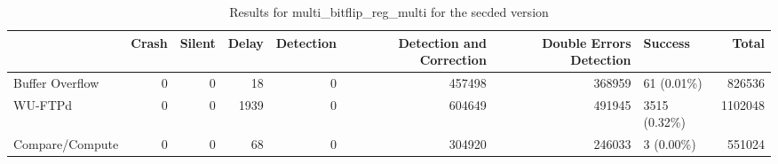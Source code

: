\begin{table}[t]
	\centering
	\caption{Results for multi_bitflip_reg_multi for the secded version}
	\label{table:end_sim_by_status_secded_4_multi_bitflip_reg_multi}
	\begin{tabular}{lrrrrrrlr}
		\toprule
		                & Crash & Silent & Delay & Detection & Detection and Correction & Double Errors Detection & Success       & Total   \\
		\midrule
		Buffer Overflow & 0     & 0      & 18    & 0         & 457498                   & 368959                  & 61 (0.01\%)   & 826536  \\
		WU-FTPd         & 0     & 0      & 1939  & 0         & 604649                   & 491945                  & 3515 (0.32\%) & 1102048 \\
		Compare/Compute & 0     & 0      & 68    & 0         & 304920                   & 246033                  & 3 (0.00\%)    & 551024  \\
		\bottomrule
	\end{tabular}
\end{table}
